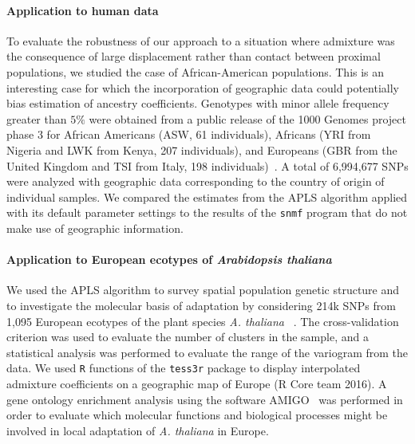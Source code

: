 \paragraph{Application to human data} To evaluate the robustness of our approach
to a situation where admixture was the consequence of large displacement rather
than contact between proximal populations, we studied the case of
African-American populations. This is an interesting case for which the
incorporation of geographic data could potentially bias estimation of ancestry
coefficients. Genotypes with minor allele frequency greater than $5 \%$ were
obtained from a public release of the 1000 Genomes project phase 3 for African
Americans (ASW, 61 individuals), Africans (YRI from Nigeria and LWK from Kenya,
207 individuals), and Europeans (GBR from the United Kingdom and TSI from Italy,
198 individuals)~\citep{1000genome}. A total of 6,994,677 SNPs were analyzed
with geographic data corresponding to the country of origin of individual
samples. We compared the estimates from the APLS algorithm applied with its
default parameter settings to the results of the {\tt snmf} program that do not
make use of geographic information.

\paragraph{Application to European ecotypes of {\it Arabidopsis thaliana}} We
used the APLS algorithm to survey spatial population genetic structure and to
investigate the molecular basis of adaptation by considering 214k SNPs from
1,095 European ecotypes of the plant species {\it A. thaliana}
~\citep{Horton2012}. The cross-validation criterion was used to evaluate the
number of clusters in the sample, and a statistical analysis was performed to
evaluate the range of the variogram from the data. We used {\tt R} functions of
the {\tt tess3r} package to display interpolated admixture coefficients on a
geographic map of Europe (R Core team 2016). A gene ontology enrichment analysis
using the software AMIGO~\citep{Carbon2009} was performed in order to evaluate
which molecular functions and biological processes might be involved in local
adaptation of {\it A. thaliana} in Europe.


